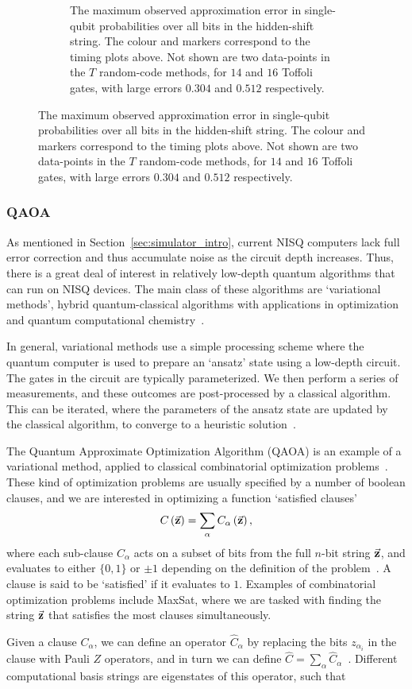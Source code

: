 \begin{figure}[H]
\begin{subfigure}[t]{0.65\textwidth}
\caption{The maximum observed approximation error in single-qubit probabilities over all bits in the hidden-shift string. The colour and markers correspond to the timing plots above. Not shown are two data-points in the $T$ random-code methods, for $14$ and $16$ Toffoli gates, with large errors $0.304$ and $0.512$ respectively.}
\end{subfigure}
\end{figure}
\subsubsection*{QAOA}
As mentioned in Section~\ref{sec:simulator_intro}, current NISQ computers lack full error correction and thus accumulate noise as the circuit depth increases. Thus, there is a great deal of interest in relatively low-depth quantum algorithms that can run on NISQ devices. The main class of these algorithms are `variational methods', hybrid quantum-classical algorithms with applications in optimization and quantum computational chemistry~\cite{Moll2018}.\par
In general, variational methods use a simple processing scheme where the quantum computer is used to prepare an `ansatz' state using a low-depth circuit. The gates in the circuit are typically parameterized. We then perform a series of measurements, and these outcomes are post-processed by a classical algorithm. This can be iterated, where the parameters of the ansatz state are updated by the classical algorithm, to converge to a heuristic solution~\cite{Preskill2018,Moll2018}.\par
The Quantum Approximate Optimization Algorithm (QAOA) is an example of a variational method, applied to classical combinatorial optimization problems~\cite{Farhi2014}. These kind of optimization problems are usually specified by a number of boolean clauses, and we are interested in optimizing a function `satisfied clauses'
\[C\left(\va{z}\right) = \sum_{\alpha} C_{\alpha}\left(\va{z}\right),\]
where each sub-clause $C_{\alpha}$ acts on a subset of bits from the full $n$-bit string $\va{z}$, and evaluates to either $\{0,1\}$ or $\pm 1$ depending on the definition of the problem~\cite{Farhi2014}. A clause is said to be `satisfied' if it evaluates to $1$. Examples of combinatorial optimization problems include MaxSat, where we are tasked with finding the string $\va{z}$ that satisfies the most clauses simultaneously.\par
Given a clause $C_{\alpha}$, we can define an operator $\hat{C}_{\alpha}$ by replacing the bits $z_{\alpha_{i}}$ in the clause with Pauli $Z$ operators, and in turn we can define $\hat{C}=\sum_{\alpha}\hat{C}_{\alpha}$~\cite{Farhi2014}. Different computational basis strings are eigenstates of this operator, such that 
